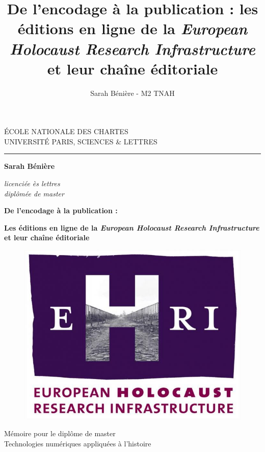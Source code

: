 \documentclass[a4paper, 12pt, twoside]{book}
\author{Sarah Bénière - M2 TNAH}
\title{De l'encodage à la publication : les éditions en ligne de la \textit{European Holocaust Research Infrastructure} et leur chaîne éditoriale}
\begin{document}
    \begin{titlepage}
		\begin{center}
			
			\bigskip
			
			\begin{large}				
				ÉCOLE NATIONALE DES CHARTES\\
				UNIVERSITÉ PARIS, SCIENCES \& LETTRES
			\end{large}
			\begin{center}\rule{2cm}{0.02cm}\end{center}
			
			\bigskip
			\bigskip
			\bigskip
			
			\begin{Large}
				\textbf{Sarah Bénière}\\
			\end{Large}
			\begin{normalsize} \textit{licenciée ès lettres}\\
				\textit{diplômée de master}
			\end{normalsize}
			
			\bigskip
			\bigskip
			\bigskip
			
			\begin{Huge}
				\textbf{De l'encodage à la publication :}\\
			\end{Huge}
			\bigskip
			\bigskip
			\begin{LARGE}
				\textbf{Les éditions en ligne de la \textit{European Holocaust Research Infrastructure} et leur chaîne éditoriale}\\
			\end{LARGE}
			
			\bigskip
			\bigskip
			\bigskip

            \begin{figure}[h]
                \centering
                \includegraphics[width=0.5\linewidth]{1-FRONT//images/logo-ehri.jpg}
                \label{fig:logo-ehri}
            \end{figure}
   
			\vfill
			
			\begin{large}
				Mémoire 
				pour le diplôme de master \\
				\og{} Technologies numériques appliquées à l'histoire \fg{} \\
			\end{large}
		\end{center}
	\end{titlepage}
\end{document}
